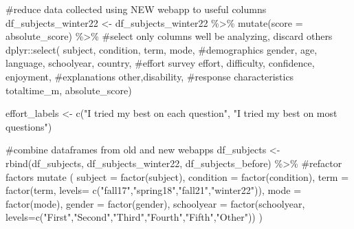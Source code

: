 \documentclass[
  letterpaper,
  DIV=11,
  numbers=noendperiod]{scrreprt}
\newenvironment{Shaded}{\begin{snugshade}}{\end{snugshade}}
\newcommand{\AttributeTok}[1]{\textcolor[rgb]{0.40,0.45,0.13}{#1}}
\newcommand{\CommentTok}[1]{\textcolor[rgb]{0.37,0.37,0.37}{#1}}
\newcommand{\FunctionTok}[1]{\textcolor[rgb]{0.28,0.35,0.67}{#1}}
\newcommand{\NormalTok}[1]{\textcolor[rgb]{0.00,0.23,0.31}{#1}}
\newcommand{\OtherTok}[1]{\textcolor[rgb]{0.00,0.23,0.31}{#1}}
\newcommand{\SpecialCharTok}[1]{\textcolor[rgb]{0.37,0.37,0.37}{#1}}
\newcommand{\StringTok}[1]{\textcolor[rgb]{0.13,0.47,0.30}{#1}}
\begin{document}
\begin{Shaded}
\begin{Highlighting}[]
\CommentTok{\#reduce data collected using NEW webapp to useful columns}
\NormalTok{df\_subjects\_winter22 }\OtherTok{\textless{}{-}}\NormalTok{ df\_subjects\_winter22 }\SpecialCharTok{\%\textgreater{}\%} 
  \FunctionTok{mutate}\NormalTok{(}\AttributeTok{score =}\NormalTok{ absolute\_score) }\SpecialCharTok{\%\textgreater{}\%} 
  \CommentTok{\#select only columns we\textquotesingle{}ll be analyzing, discard others}
\NormalTok{  dplyr}\SpecialCharTok{::}\FunctionTok{select}\NormalTok{( subject, condition, term, mode, }
                 \CommentTok{\#demographics}
\NormalTok{                 gender, age, language, schoolyear, country,}
                 \CommentTok{\#effort survey}
\NormalTok{                 effort, difficulty, confidence, enjoyment, }
                 \CommentTok{\#explanations}
\NormalTok{                 other,disability,}
                 \CommentTok{\#response characteristics}
\NormalTok{                 totaltime\_m, absolute\_score)}


\NormalTok{effort\_labels }\OtherTok{\textless{}{-}} \FunctionTok{c}\NormalTok{(}\StringTok{"I tried my best on each question"}\NormalTok{, }\StringTok{"I tried my best on most questions"}\NormalTok{)}

\CommentTok{\#combine dataframes from old and new webapps}
\NormalTok{df\_subjects }\OtherTok{\textless{}{-}} \FunctionTok{rbind}\NormalTok{(df\_subjects, df\_subjects\_winter22, df\_subjects\_before) }\SpecialCharTok{\%\textgreater{}\%} 
  \CommentTok{\#refactor factors}
  \FunctionTok{mutate}\NormalTok{ (}
    \AttributeTok{subject =} \FunctionTok{factor}\NormalTok{(subject),}
    \AttributeTok{condition =} \FunctionTok{factor}\NormalTok{(condition),}
    \AttributeTok{term =} \FunctionTok{factor}\NormalTok{(term, }\AttributeTok{levels=} \FunctionTok{c}\NormalTok{(}\StringTok{"fall17"}\NormalTok{,}\StringTok{"spring18"}\NormalTok{,}\StringTok{"fall21"}\NormalTok{,}\StringTok{"winter22"}\NormalTok{)),}
    \AttributeTok{mode =} \FunctionTok{factor}\NormalTok{(mode),}
    \AttributeTok{gender =} \FunctionTok{factor}\NormalTok{(gender),}
    \AttributeTok{schoolyear =} \FunctionTok{factor}\NormalTok{(schoolyear, }\AttributeTok{levels=}\FunctionTok{c}\NormalTok{(}\StringTok{"First"}\NormalTok{,}\StringTok{"Second"}\NormalTok{,}\StringTok{"Third"}\NormalTok{,}\StringTok{"Fourth"}\NormalTok{,}\StringTok{"Fifth"}\NormalTok{,}\StringTok{"Other"}\NormalTok{))}
\NormalTok{  )}


\end{Highlighting}
\end{Shaded}
\end{document}
